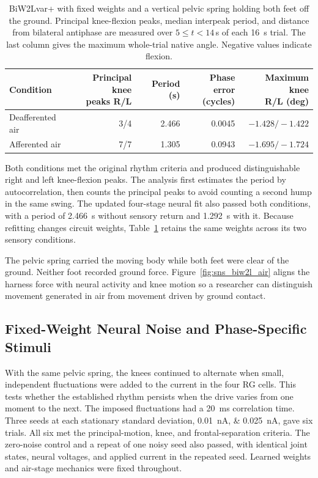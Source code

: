 \begin{table}[htbp]
\centering\small
\caption[Fixed-controller air-stage evaluations]{BiW2Lvar+ with fixed weights and a vertical pelvic spring holding both feet off the ground. Principal knee-flexion peaks, median interpeak period, and distance from bilateral antiphase are measured over $5\leq t<14$\,s of each \qty{16}{\second} trial. The last column gives the maximum whole-trial native angle. Negative values indicate flexion.}
\label{tab:app_air_stages}
\begin{tabularx}{\textwidth}{@{}>{\raggedright\arraybackslash}Xrrrr@{}}
\toprule
Condition & \shortstack{Principal knee\\peaks R/L} & Period (s) & \shortstack{Phase error\\(cycles)} & \shortstack{Maximum knee\\R/L (deg)} \\
\midrule
Deafferented air & 3/4 & 2.466 & 0.0045 & $-1.428/-1.422$ \\
Afferented air & 7/7 & 1.305 & 0.0943 & $-1.695/-1.724$ \\
\bottomrule
\end{tabularx}
\end{table}

Both conditions met the original rhythm criteria and produced distinguishable right and left knee-flexion peaks. The analysis first estimates the period by autocorrelation, then counts the principal peaks to avoid counting a second hump in the same swing. The updated four-stage neural fit also passed both conditions, with a period of \qty{2.466}{\second} without sensory return and \qty{1.292}{\second} with it. Because refitting changes circuit weights, Table~\ref{tab:app_air_stages} retains the same weights across its two sensory conditions.

The pelvic spring carried the moving body while both feet were clear of the ground. Neither foot recorded ground force. Figure~\ref{fig:sns_biw2l_air} aligns the harness force with neural activity and knee motion so a researcher can distinguish movement generated in air from movement driven by ground contact.

\subsection{Fixed-Weight Neural Noise and Phase-Specific Stimuli}\label{sec:app_current_noise}\label{sec:app_biw2l_stimulus}

With the same pelvic spring, the knees continued to alternate when small, independent fluctuations were added to the current in the four RG cells. This tests whether the established rhythm persists when the drive varies from one moment to the next. The imposed fluctuations had a \qty{20}{\milli\second} correlation time. Three seeds at each stationary standard deviation, \qtylist{0.01;0.025}{\nano\ampere}, gave six trials. All six met the principal-motion, knee, and frontal-separation criteria. The zero-noise control and a repeat of one noisy seed also passed, with identical joint states, neural voltages, and applied current in the repeated seed. Learned weights and air-stage mechanics were fixed throughout.

